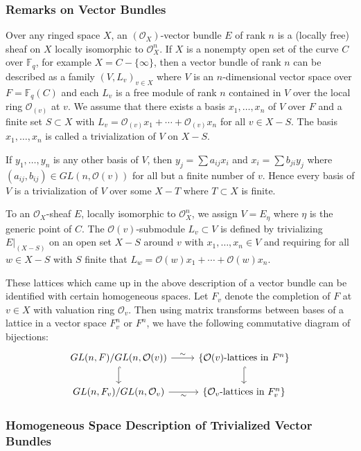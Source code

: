 \documentclass[12pt,a4paper]{article}
\theoremstyle{plain}
\theoremstyle{definition}
\theoremstyle{remark}
\newcommand{\bF}{\mathbb{F}}
\newcommand{\cO}{\mathcal{O}}
\providecommand{\cO}{\mathcal{O}}
\begin{document}
\subsubsection*{Remarks on Vector Bundles}

Over any ringed space $X$, an $(\cO_X)$-vector bundle $E$ of rank $n$ is a (locally free) sheaf on $X$ locally isomorphic to $\cO_X^n$. If $X$ is a nonempty open set of the curve $C$ over $\bF_q$, for example $X = C - \{\infty\}$, then a vector bundle of rank $n$ can be described as a family $(V, L_v)_{v \in X}$ where $V$ is an $n$-dimensional vector space over $F = \bF_q(C)$ and each $L_v$ is a free module of rank $n$ contained in $V$ over the local ring $\cO_{(v)}$ at $v$. We assume that there exists a basis $x_1, \ldots, x_n$ of $V$ over $F$ and a finite set $S \subset X$ with $L_v = \cO_{(v)} x_1 + \cdots + \cO_{(v)} x_n$ for all $v \in X - S$. The basis $x_1, \ldots, x_n$ is called a trivialization of $V$ on $X - S$.

If $y_1, \ldots, y_n$ is any other basis of $V$, then $y_j = \sum a_{ij} x_i$ and $x_i = \sum b_{ji} y_j$ where $(a_{ij}, b_{ij}) \in GL(n, \cO(v))$ for all but a finite number of $v$. Hence every basis of $V$ is a trivialization of $V$ over some $X - T$ where $T \subset X$ is finite.

To an $\cO_X$-sheaf $E$, locally isomorphic to $\cO_X^n$, we assign $V = E_\eta$ where $\eta$ is the generic point of $C$. The $\cO(v)$-submodule $L_v \subset V$ is defined by trivializing $E|_{(X-S)}$ on an open set $X-S$ around $v$ with $x_1, \ldots, x_n \in V$ and requiring for all $w \in X - S$ with $S$ finite that $L_w = \cO(w)x_1 + \cdots + \cO(w)x_n$.

These lattices which came up in the above description of a vector bundle can be identified with certain homogeneous spaces. Let $F_v$ denote the completion of $F$ at $v \in X$ with valuation ring $\cO_v$. Then using matrix transforms between bases of a lattice in a vector space $F_v^n$ or $F^n$, we have the following commutative diagram of bijections:
\[
\begin{tikzcd}
GL(n, F)/GL(n, \cO(v)) \arrow[r, "\sim"] \arrow[d, hook] & \{\cO(v)\text{-lattices in } F^n\} \arrow[d, hook] \\
GL(n, F_v)/GL(n, \cO_v) \arrow[r, "\sim"'] & \{\cO_v\text{-lattices in } F_v^n\}
\end{tikzcd}
\]

\subsubsection*{Homogeneous Space Description of Trivialized Vector Bundles}
\end{document}
